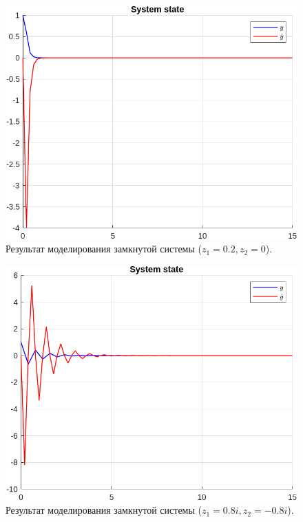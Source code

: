 \documentclass[a4paper, 14pt]{extarticle}
\theoremstyle{definition}
\theoremstyle{plain}
\theoremstyle{remark}
\begin{document}
\begin{figure}
    [H]
    \centering
    \includegraphics[width=350pt]{images/task2_d__3_state.png}
    \caption{Результат моделирования замкнутой системы ($z_1=0.2, z_2=0$).}
\end{figure}
\begin{figure}
    [H]
    \centering
    \includegraphics[width=350pt]{images/task2_d__4_state.png}
    \caption{Результат моделирования замкнутой системы ($z_1=0.8i, z_2=-0.8i$).}
\end{figure}
\end{document}
